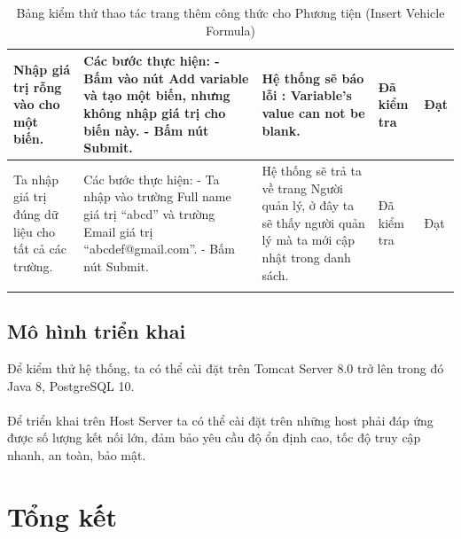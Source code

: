 \documentclass[a4paper]{article}
\begin{document}
\begin{longtable}{ | p{} |p{} | p{}  | p{}  | p{}  | }
\hline
Nhập giá trị rỗng vào cho một biến. &
Các bước thực hiện: \newline
- Bấm vào nút Add variable và tạo một biến, nhưng không nhập giá trị cho biến này. \newline
- Bấm nút Submit.  
&
Hệ thống sẽ báo lỗi : Variable's value can not be blank.
&
Đã kiểm tra &
Đạt \\

\hline
Ta nhập giá trị đúng dữ liệu cho tất cả các trường. &
Các bước thực hiện: \newline
- Ta nhập vào trường Full name giá trị “abcd” và trường Email giá trị “abcdef@gmail.com”. \newline
- Bấm nút Submit.  
&
Hệ thống sẽ trả ta về trang Người quản lý, ở đây ta sẽ thấy người quản lý mà ta mới cập nhật trong danh sách.
&
Đã kiểm tra &
Đạt \\

\hline
\caption{Bảng kiểm thử thao tác trang thêm công thức cho Phương tiện (Insert Vehicle Formula)}
\end{longtable}

\subsection{Mô hình triển khai }
Để kiểm thử hệ thống, ta có thể cài đặt trên Tomcat Server 8.0 trở lên trong đó Java 8, PostgreSQL 10.\\\\
Để triển khai trên Host Server ta có thể cài đặt trên những host phải đáp ứng được số lượng kết nối lớn, đảm bảo yêu cầu độ ổn định cao, tốc độ truy cập nhanh, an toàn, bảo mật.

\section{Tổng kết}
\end{document}
